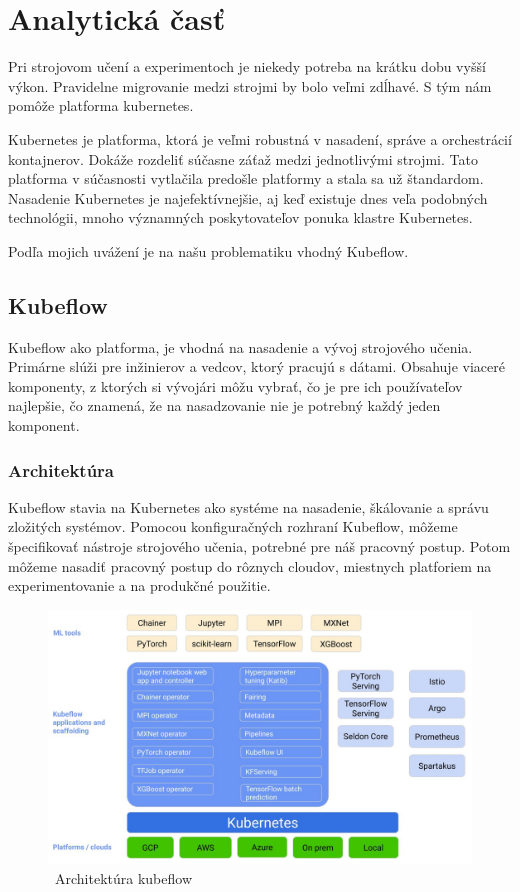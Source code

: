 
\chapter{Analytická časť}
Pri strojovom učení a experimentoch je niekedy potreba na krátku dobu vyšší výkon. Pravidelne migrovanie medzi strojmi by bolo veľmi zdĺhavé. S tým nám pomôže platforma kubernetes.

Kubernetes je platforma, ktorá je veľmi robustná v nasadení, správe a orchestrácií kontajnerov. Dokáže rozdeliť súčasne záťaž medzi jednotlivými strojmi. Tato platforma v súčasnosti vytlačila predošle platformy a stala sa už štandardom. Nasadenie Kubernetes je najefektívnejšie, aj keď existuje dnes veľa podobných technológii, mnoho významných poskytovateľov ponuka klastre Kubernetes.

Podľa mojich uvážení je na našu problematiku vhodný Kubeflow.


\section{Kubeflow}

Kubeflow ako platforma, je vhodná na nasadenie a vývoj strojového učenia. Primárne slúži pre inžinierov a vedcov, ktorý pracujú s dátami. Obsahuje viaceré komponenty, z ktorých si vývojári môžu vybrať, čo je pre ich používateľov najlepšie, čo znamená, že na nasadzovanie nie je potrebný každý jeden komponent.\cite{web}

\subsection{Architektúra}

Kubeflow stavia na Kubernetes ako systéme na nasadenie, škálovanie a správu zložitých systémov. Pomocou konfiguračných rozhraní Kubeflow, môžeme špecifikovať nástroje strojového učenia, potrebné pre náš pracovný postup. Potom môžeme nasadiť pracovný postup do rôznych cloudov, miestnych platforiem na experimentovanie a na produkčné použitie.\cite{web}
\clearpage
\begin{figure}[!ht]
    \includegraphics[width=.9\textwidth]{figures/kubeflowaarch}
    \caption{\ Architektúra kubeflow \label{o:latex_friendly_zone}}
\end{figure}
